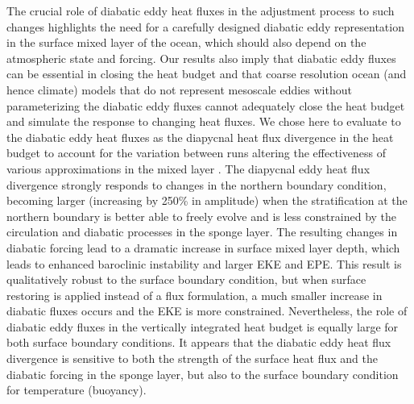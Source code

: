 The crucial role of diabatic eddy heat fluxes in the adjustment process to such changes highlights the need for a carefully designed diabatic eddy representation in the surface mixed layer of the ocean, which should also depend on the atmospheric state and forcing. Our results also imply that diabatic eddy fluxes can be essential in closing the heat budget and that coarse resolution ocean (and hence climate) models that do not represent mesoscale eddies without parameterizing the diabatic eddy fluxes cannot adequately close the heat budget and simulate the response to changing heat fluxes. We chose here to evaluate to the diabatic eddy heat fluxes as the diapycnal heat flux divergence in the heat budget to account for the variation between runs altering the effectiveness of various approximations in the mixed layer . The diapycnal eddy heat flux divergence strongly responds to changes in the northern boundary condition, becoming larger (increasing by 250\% in amplitude) when the stratification at the northern boundary is better able to freely evolve and is less constrained by the circulation and diabatic processes in the sponge layer. The resulting changes in diabatic forcing lead to a dramatic increase in surface mixed layer depth, which leads to enhanced baroclinic instability and larger EKE and EPE. This result is qualitatively robust to the surface boundary condition, but when surface restoring is applied instead of a flux formulation, a much smaller increase in diabatic fluxes occurs and the EKE is more constrained. Nevertheless, the role of diabatic eddy fluxes in the vertically integrated heat budget is equally large for both surface boundary conditions. It appears that the diabatic eddy heat flux divergence is sensitive to both the strength of the surface heat flux and the diabatic forcing in the sponge layer, but also to the surface boundary condition for temperature (buoyancy). 

